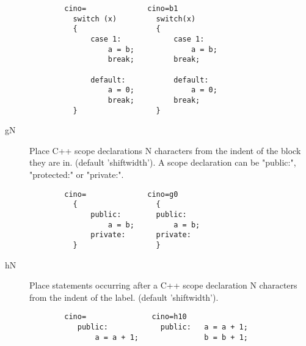 \begin{description}
\begin{verbatim}
        cino=              cino=b1
          switch (x)         switch(x)
          {                  {
              case 1:            case 1:
                  a = b;             a = b;
                  break;         break;

              default:           default:
                  a = 0;             a = 0;
                  break;         break;
          }                  }
 \end{verbatim}
 
    \item[gN] Place C++ scope declarations N characters from the indent of the
          block they are in.  (default 'shiftwidth').  A scope declaration
          can be "public:", "protected:" or "private:".
\begin{verbatim}
        cino=              cino=g0
          {                  {
              public:        public:
                  a = b;         a = b;
              private:       private:
          }                  }
\end{verbatim}

    \item[hN] Place statements occurring after a C++ scope declaration N
          characters from the indent of the label.  (default
          'shiftwidth').
\begin{verbatim}
        cino=               cino=h10
           public:            public:   a = a + 1;
               a = a + 1;               b = b + 1;
 

\end{verbatim}
\end{description}
